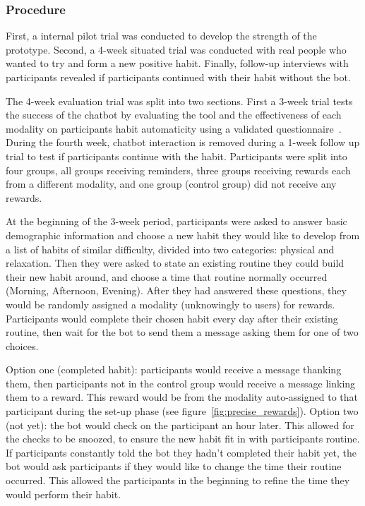 \subsubsection{Procedure}
First, a internal pilot trial was conducted to develop the strength of the prototype. Second, a  4-week situated trial was conducted with real people who wanted to try and form a new positive habit. Finally, follow-up interviews with participants revealed if participants continued with their habit without the bot.

The 4-week evaluation trial was split into two sections. First a 3-week trial tests the success of the chatbot by evaluating the tool and the effectiveness of each modality on participants habit automaticity using a validated questionnaire~\cite{article_4q_SRBAI}. During the fourth week, chatbot interaction is removed during a 1-week follow up trial to test if participants continue with the habit. Participants were split into four groups, all groups receiving reminders, three groups receiving rewards each from a different modality, and one group (control group) did not receive any rewards.

At the beginning of the 3-week period, participants were asked to answer basic demographic information and choose a new habit they would like to develop from a list of habits of similar difficulty, divided into two categories: physical and relaxation. Then they were asked to state an existing routine they could build their new habit around, and choose a time that routine normally occurred (Morning, Afternoon, Evening). After they had answered these questions, they would be randomly assigned a modality (unknowingly to users) for rewards. Participants would complete their chosen habit every day after their existing routine, then wait for the bot to send them a message asking them for one of two choices.

Option one (completed habit): participants would receive a message thanking them, then participants not in the control group would receive a message linking them to a reward. This reward would be from the modality auto-assigned to that participant during the set-up phase (see figure~\ref{fig:precise_rewards}). Option two (not yet): the bot would check on the participant an hour later. This allowed for the checks to be snoozed, to ensure the new habit fit in with participants routine. If participants constantly told the bot they hadn't completed their habit yet, the bot would ask participants if they would like to change the time their routine occurred. This allowed the participants in the beginning to refine the time they would perform their habit.

